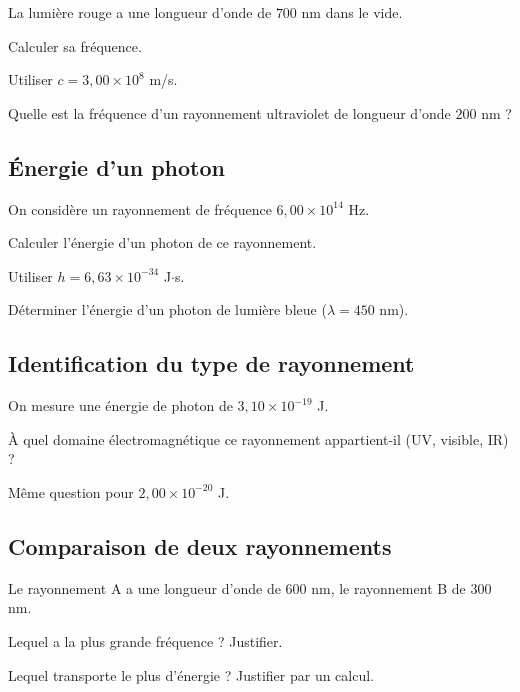 \documentclass[12pt]{article}
\begin{document}
\begin{compactitem}
    \item La lumière rouge a une longueur d’onde de $700$ nm dans le vide.
    \item Calculer sa fréquence.
    \item Utiliser $c = 3{,}00 \times 10^8$ m/s.
    \item Quelle est la fréquence d’un rayonnement ultraviolet de longueur d’onde $200$ nm ?
\end{compactitem}

\subsection{Énergie d’un photon}

\begin{compactitem}
    \item On considère un rayonnement de fréquence $6{,}00 \times 10^{14}$ Hz.
    \item Calculer l’énergie d’un photon de ce rayonnement.
    \item Utiliser $h = 6{,}63 \times 10^{-34}$ J$\cdot$s.
    \item Déterminer l’énergie d’un photon de lumière bleue ($\lambda = 450$ nm).
\end{compactitem}

\subsection{Identification du type de rayonnement}


\begin{compactitem}
    \item On mesure une énergie de photon de $3{,}10 \times 10^{-19}$ J.
    \item À quel domaine électromagnétique ce rayonnement appartient-il (UV, visible, IR) ?
    \item Même question pour $2{,}00 \times 10^{-20}$ J.
\end{compactitem}

\subsection{Comparaison de deux rayonnements}

\begin{compactitem}
    \item Le rayonnement A a une longueur d’onde de $600$ nm, le rayonnement B de $300$ nm.
    \item Lequel a la plus grande fréquence ? Justifier.
    \item Lequel transporte le plus d’énergie ? Justifier par un calcul.
\end{compactitem}
\end{document}
